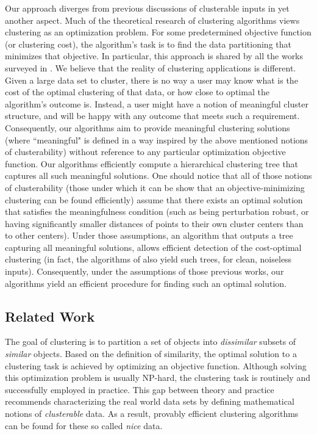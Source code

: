 \documentclass[orivec]{llncs}
\begin{document}
Our approach diverges from previous discussions of clusterable inputs in yet another aspect. Much of the theoretical research of clustering algorithms views clustering as an optimization problem. For some predetermined objective function (or clustering cost), the algorithm's task is to find the data partitioning that minimizes that objective. In particular, this approach is shared by all the works surveyed in \cite{ben2015computational}. We believe that the reality of clustering applications is different. Given a large data set to cluster, there is no way a user may know what is the cost of the optimal clustering of that data, or how close to optimal the algorithm's outcome is. Instead, a user might have a notion of meaningful cluster structure, and will be happy with any outcome that meets such a requirement. Consequently, our algorithms aim to provide meaningful clustering solutions (where ``meaningful" is defined in a way inspired by the above mentioned notions of clusterability) without reference to any particular optimization objective function. Our algorithms efficiently compute a hierarchical clustering tree that captures all such meaningful solutions. One should notice that all of those notions of clusterability (those under which it can be show that an objective-minimizing clustering can be found efficiently) assume that there exists an optimal solution that satisfies the meaningfulness condition (such as being perturbation robust, or having significantly smaller distances of points to their own cluster centers than to other centers). Under those assumptions, an algorithm that outputs a tree capturing all meaningful solutions, allows efficient detection of the cost-optimal clustering (in fact, the algorithms of \cite{balcan2012clustering} also yield such trees, for clean, noiseless inputs). Consequently, under the assumptions of those previous works, our algorithms yield an efficient procedure for finding such an optimal solution.

\subsection{Related Work}
The goal of clustering is to partition a set of objects into {\em dissimilar} subsets of {\em similar} objects. Based on the definition of similarity, the optimal solution to a clustering task is achieved by optimizing an objective function. Although solving this optimization problem is usually NP-hard, the clustering task is routinely and successfully employed in practice. This gap between theory and practice recommends characterizing the real world data sets by defining mathematical notions of {\em clusterable} data. As a result, provably efficient clustering algorithms can be found for these so called {\em nice} data.  
\end{document}
